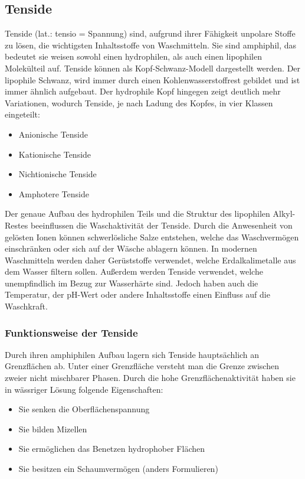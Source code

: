 \documentclass[main.tex]{subfiles}
\begin{document}
\subsection{Tenside}

Tenside (lat.: tensio = Spannung) sind, aufgrund ihrer Fähigkeit unpolare Stoffe zu lösen, die wichtigsten Inhaltsstoffe von Waschmitteln. Sie sind amphiphil, das bedeutet sie weisen sowohl einen hydrophilen, als auch einen lipophilen Molekülteil auf. Tenside können als Kopf-Schwanz-Modell dargestellt werden. Der lipophile Schwanz, wird immer durch einen Kohlenwasserstoffrest gebildet und ist immer ähnlich aufgebaut. Der hydrophile Kopf hingegen zeigt deutlich mehr Variationen, wodurch Tenside, je nach Ladung des Kopfes, in vier Klassen eingeteilt:

\begin{itemize}
	\item Anionische Tenside
	\item Kationische Tenside
	\item Nichtionische Tenside
	\item Amphotere Tenside
\end{itemize}

Der genaue Aufbau des hydrophilen Teils und die Struktur des lipophilen Alkyl-Restes beeinflussen die Waschaktivität der Tenside. Durch die Anwesenheit von gelösten Ionen können schwerlösliche Salze entstehen, welche das Waschvermögen einschränken oder sich auf der Wäsche ablagern können. In modernen Waschmitteln werden daher Gerüststoffe verwendet, welche Erdalkalimetalle aus dem Wasser filtern sollen. Außerdem werden Tenside verwendet, welche unempfindlich im Bezug zur Wasserhärte sind. Jedoch haben auch die Temperatur, der pH-Wert oder andere Inhaltsstoffe einen Einfluss auf die Waschkraft.

\subsubsection{Funktionsweise der Tenside}

Durch ihren amphiphilen Aufbau lagern sich Tenside hauptsächlich an Grenzflächen ab. Unter einer Grenzfläche versteht man die Grenze zwischen zweier nicht mischbarer Phasen. Durch die hohe Grenzflächenaktivität haben sie in wässriger Lösung folgende Eigenschaften:

\begin{itemize}
	\item Sie senken die Oberflächenspannung
	\item Sie bilden Mizellen
	\item Sie ermöglichen das Benetzen hydrophober Flächen
	\item Sie besitzen ein Schaumvermögen (anders Formulieren)
\end{itemize}
\end{document}
